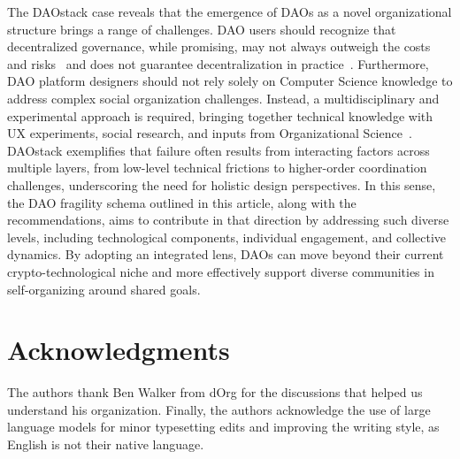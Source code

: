\documentclass[10pt,lineno]{wlpeerj}
\begin{document}
The DAOstack case reveals that the emergence of DAOs as a novel organizational structure brings a range of challenges.  DAO users should recognize that decentralized governance, while promising, may not always outweigh the costs and risks~\citep{halaburda_will_2019} and does not guarantee decentralization in practice~\citep{goldberg_metaverse_2023}. Furthermore, DAO platform designers should not rely solely on Computer Science knowledge to address complex social organization challenges. Instead, a multidisciplinary and experimental approach is required, bringing together technical knowledge with UX experiments, social research, and inputs from Organizational Science~\citep{Open_Problems_2023}. DAOstack exemplifies that failure often results from interacting factors across multiple layers, from low-level technical frictions to higher-order coordination challenges, underscoring the need for holistic design perspectives. In this sense, the DAO fragility schema outlined in this article, along with the recommendations, aims to contribute in that direction by addressing such diverse levels, including technological components, individual engagement, and collective dynamics. By adopting an integrated lens, DAOs can move beyond their current crypto-technological niche and more effectively support diverse communities in self-organizing around shared goals.


\section*{Acknowledgments}
The authors thank Ben Walker from dOrg for the discussions that helped us understand his organization. Finally, the authors acknowledge the use of large language models for minor typesetting edits and improving the writing style, as English is not their native language.


\end{document}
